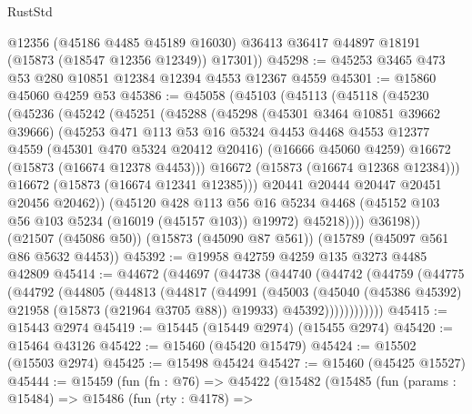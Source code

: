 \begin{lexlean}{RustStd}
\begin{coremodule}
        @12356
        (@45186 @4485 @45189 @16030)
        @36413
        @36417
        @44897
        @18191
        (@15873 (@18547 @12356 @12349))
        @17301))
@45298 := @45253 @3465 @473 @53 @280 @10851 @12384 @12394 @4553 @12367 @4559
@45301 := @15860 @45060 @4259 @53
@45386 := @45058
    (@45103
      (@45113
        (@45118
          (@45230
            (@45236
              (@45242
                (@45251
                  (@45288
                    (@45298
                      (@45301 @3464 @10851 @39662 @39666)
                      (@45253
                        @471
                        @113
                        @53
                        @16
                        @5324
                        @4453
                        @4468
                        @4553
                        @12377
                        @4559
                        (@45301 @470 @5324 @20412 @20416)
                        (@16666 @45060 @4259)
                        @16672
                        (@15873 (@16674 @12378 @4453)))
                      @16672
                      (@15873 (@16674 @12368 @12384)))
                    @16672
                    (@15873 (@16674 @12341 @12385)))
                  @20441
                  @20444
                  @20447
                  @20451
                  @20456
                  @20462))
              (@45120
                @428
                @113
                @56
                @16
                @5234
                @4468
                (@45152 @103 @56 @103 @5234 (@16019 (@45157 @103)) @19972)
                @45218))))
        @36198))
    (@21507 (@45086 @50))
    (@15873 (@45090 @87 @561))
    (@15789 (@45097 @561 @86 @5632 @4453))
@45392 := @19958 @42759 @4259 @135 @3273 @4485 @42809
@45414 := @44672
    (@44697
      (@44738
        (@44740
          (@44742
            (@44759
              (@44775
                (@44792
                  (@44805
                    (@44813
                      (@44817
                        (@44991
                          (@45003
                            (@45040 (@45386 @45392) @21958 (@15873 (@21964 @3705 @88)) @19933)
                            @45392))))))))))))
@45415 := @15443 @2974
@45419 := @15445 (@15449 @2974) (@15455 @2974)
@45420 := @15464 @43126
@45422 := @15460 (@45420 @15479)
@45424 := @15502 (@15503 @2974)
@45425 := @15498 @45424
@45427 := @15460 (@45425 @15527)
@45444 := @15459
    (fun (fn : @76) =>
    @45422
      (@15482
        (@15485
          (fun (params : @15484) =>
          @15486
            (fun (rty : @4178) =>

\end{coremodule}
\end{lexlean}
